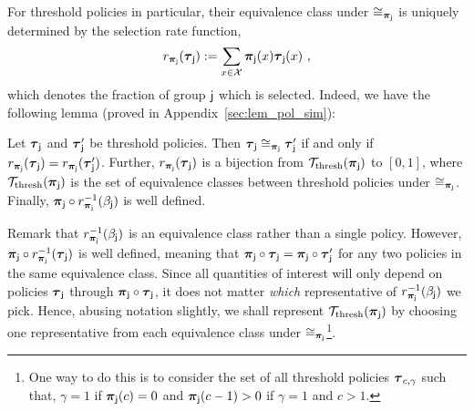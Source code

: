 	For threshold policies in particular, their equivalence class under $\simj$ is uniquely determined by the selection rate function,
		\begin{eqnarray}
		\ratef_{\distj}(\polj) := \sum_{x \in \X} \distj(x) \polj(x)~,
		\end{eqnarray}
		which denotes the fraction of group $\popj$ which is selected. Indeed, we have the following lemma (proved in Appendix~\ref{sec:lem_pol_sim}): 

	\begin{lem}\label{lem:pol_sim_lemma} Let $\polj$ and $\polj'$ be threshold policies. Then $\polj \simj \polj'$ if and only if $\ratef_{\distj}(\polj) = \ratef_{\distj}(\polj')$. 
	Further, $\ratef_{\distj}(\polj)$ is a bijection from $\Monotone(\distj)$ to $[0,1]$, where $\Monotone(\distj)$ is the set of equivalence classes between threshold policies under $\simj$. Finally, $\distj \circ \ratef_{\distj}^{-1}(\accratej)$ is well defined. 
	\end{lem}
	Remark that $\ratef_{\distj}^{-1}(\accratej)$ is an equivalence class rather than a single policy. 
	However, $\distj \circ \ratef_{\distj}^{-1}(\polj)$  is well defined, meaning that $\distj \circ \polj = \distj \circ \polj'$ for any two policies in the same equivalence class. 
	Since all quantities of interest will only depend on policies $\polj$ through $\distj \circ \polj$,  it does not matter \emph{which} representative of $\ratef_{\distj}^{-1}(\accratej)$ we pick.
	Hence, abusing notation slightly, we shall represent $\Monotone(\distj)$ by choosing one representative from each equivalence class under $\simj$\footnote{One  way to do this is to consider the set of all threshold policies $\pol_{c,\gamma}$ such that, $\gamma = 1$ if $\distj(c) = 0$ and $\distj(c-1) > 0$ if $\gamma = 1$ and $c > 1$.}. 

